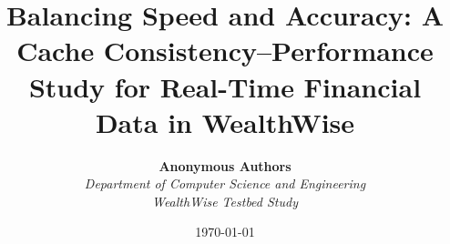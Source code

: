 \documentclass[11pt,a4paper]{article}
\begin{document}
\title{\LARGE\textbf{Balancing Speed and Accuracy: A Cache Consistency--Performance Study for Real-Time Financial Data in WealthWise}}

\author{
  \textbf{Anonymous Authors}\\[0.6em]
  \textit{Department of Computer Science and Engineering}\\
  \textit{WealthWise Testbed Study}
}
\date{\today}

\maketitle

\vspace{-1.5em}

\end{document}
